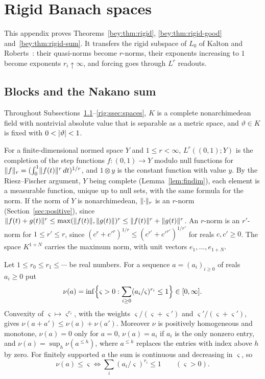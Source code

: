\section{Rigid Banach spaces}\label{app:rigid}

This appendix proves Theorems~\ref{bey:thm:rigid}, \ref{bey:thm:rigid-good} and~\ref{bey:thm:rigid-sum}. It transfers
the rigid subspace of $L_0$ of Kalton and Roberts~\cite[\S3]{KR}: their quasi-norms become $r$\nobreakdash-norms, their
exponents increasing to $1$ become exponents $r_i\uparrow\infty$, and forcing goes through $L^r$ readouts.

\subsection{Blocks and the Nakano sum}\label{rig:ssec:nakano}

Throughout Subsections~\ref{rig:ssec:nakano}--\ref{rig:ssec:spaces}, $K$ is a complete nonarchimedean field with
nontrivial absolute value that is separable as a metric space, and $\vartheta\in K$ is fixed with $0<\lvert \vartheta\rvert<1$.

For a finite-dimensional normed space $Y$ and $1\le r<\infty$, $L^r((0,1);Y)$ is the completion of the step functions
$f\colon(0,1)\to Y$ modulo null functions for $\lVert f\rVert_r=(\int_0^1\lVert f(t)\rVert^r\,dt)^{1/r}$, and $1\otimes y$ is the
constant function with value $y$. By the Riesz--Fischer argument, $Y$ being complete (Lemma~\ref{lem:findim}), each
element is a measurable function, unique up to null sets, with the same formula for the norm. If the norm of $Y$ is
nonarchimedean, $\lVert \cdot\rVert_r$ is an $r$\nobreakdash-norm (Section~\ref{sec:positive}), since
$\lVert f(t)+g(t)\rVert^r\le\max(\lVert f(t)\rVert,\lVert g(t)\rVert)^r\le\lVert f(t)\rVert^r+\lVert g(t)\rVert^r$. An $r$\nobreakdash-norm is an
$r'$\nobreakdash-norm for $1\le r'\le r$, since $(c^r+c'^r)^{1/r}\le(c^{r'}+c'^{r'})^{1/r'}$ for reals $c,c'\ge0$. The
space $K^{1+N}$ carries the maximum norm, with unit vectors $e_1,\dots,e_{1+N}$.

Let $1\le r_0\le r_1\le\cdots$ be real numbers. For a sequence $a=(a_i)_{i\ge0}$ of reals $a_i\ge0$ put
\[
 \nu(a)=\inf\Bigl\{\varsigma>0:\sum_{i\ge0}(a_i/\varsigma)^{r_i}\le1\Bigr\}\in[0,\infty].
\]
Convexity of $\varsigma\mapsto\varsigma^{r_i}$, with the weights $\varsigma/(\varsigma+\varsigma')$ and
$\varsigma'/(\varsigma+\varsigma')$, gives $\nu(a+a')\le\nu(a)+\nu(a')$. Moreover $\nu$ is positively homogeneous and monotone, $\nu(a)=0$ only for $a=0$,
$\nu(a)=a_i$ if $a_i$ is the only nonzero entry, and $\nu(a)=\sup_h\nu(a^{\le h})$, where $a^{\le h}$ replaces the
entries with index above $h$ by zero. For finitely supported $a$ the sum is continuous and decreasing in $\varsigma$, so
\begin{equation}\label{rig:eq:modular}
 \nu(a)\le\varsigma\iff\textstyle\sum_i(a_i/\varsigma)^{r_i}\le1\qquad(\varsigma>0).
\end{equation}

